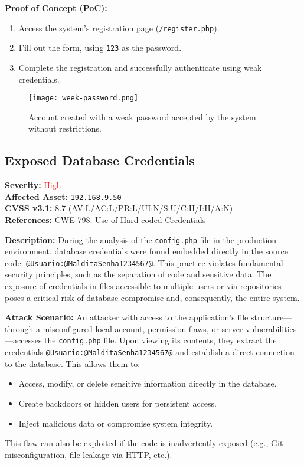 \documentclass[a4paper,12pt]{article}
\begin{document}
\textbf{Proof of Concept (PoC):}  
\begin{enumerate}
    \item Access the system's registration page (\texttt{/register.php}).  
    \item Fill out the form, using \texttt{123} as the password.  
    \item Complete the registration and successfully authenticate using weak credentials.
\end{enumerate}

\begin{figure}[H]
    \centering
    \texttt{[image: week-password.png]}
    \caption{Account created with a weak password accepted by the system without restrictions.}
\end{figure}

\clearpage

\subsection{Exposed Database Credentials}
\textbf{Severity:} \textcolor{Red}{High} \\
\textbf{Affected Asset:} \texttt{192.168.9.50} \\
\textbf{CVSS v3.1:} 8.7 (AV:L/AC:L/PR:L/UI:N/S:U/C:H/I:H/A:N) \\
\textbf{References:} CWE-798: Use of Hard-coded Credentials

\textbf{Description:}  
During the analysis of the \texttt{config.php} file in the production environment, database credentials were found embedded directly in the source code: \texttt{@Usuario:@MalditaSenha1234567@}. This practice violates fundamental security principles, such as the separation of code and sensitive data. The exposure of credentials in files accessible to multiple users or via repositories poses a critical risk of database compromise and, consequently, the entire system.

\textbf{Attack Scenario:}  
An attacker with access to the application's file structure—through a misconfigured local account, permission flaws, or server vulnerabilities—accesses the \texttt{config.php} file. Upon viewing its contents, they extract the credentials \texttt{@Usuario:@MalditaSenha1234567@} and establish a direct connection to the database. This allows them to:  
\begin{itemize}
    \item Access, modify, or delete sensitive information directly in the database.  
    \item Create backdoors or hidden users for persistent access.  
    \item Inject malicious data or compromise system integrity.  
\end{itemize}
This flaw can also be exploited if the code is inadvertently exposed (e.g., Git misconfiguration, file leakage via HTTP, etc.).
\end{document}
